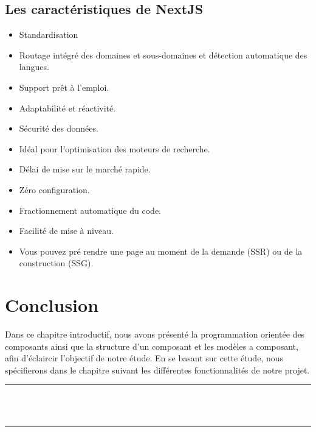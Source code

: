 \documentclass[12pt]{report}
\begin{document}
\newpage

\vspace*{0.1in}

\subsection{Les caractéristiques de NextJS}
\vspace{0.1in}

\begin{itemize}
    \item Standardisation
    \item Routage intégré des domaines et sous-domaines et détection automatique des langues.
    \item Support prêt à l’emploi.
    \item Adaptabilité et réactivité.
    \item Sécurité des données.
    \item Idéal pour l’optimisation des moteurs de recherche.
    \item Délai de mise sur le marché rapide.
    \item Zéro configuration.
    \item Fractionnement automatique du code.
    \item Facilité de mise à niveau.
    \item Vous pouvez pré rendre une page au moment de la demande (SSR) ou de la construction (SSG).
\end{itemize}

\section{Conclusion}
\vspace{0.1in}
\hspace*{0.16in}
Dans ce chapitre introductif, nous avons présenté la programmation orientée des composants ainsi que la structure d’un composant et les modèles a composant, afin d’éclaircir l’objectif de notre étude. En se basant sur cette étude, nous spécifierons dans le chapitre suivant les différentes fonctionnalités de notre projet.

\newpage

\vspace*{\fill}
\begin{center}
    {\color{Blue} \rule{\linewidth}{1.2mm} }\\
\vspace{0.25in}
    {\centering{}}
\vspace{0.35in}\\
    {\color{Blue} \rule{\linewidth}{1.2mm} }
\end{center}
\vspace*{\fill}
\setcounter{section}{0}
\end{document}
